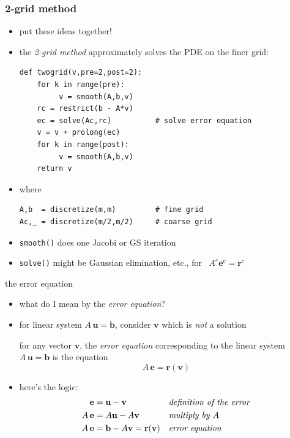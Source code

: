 \documentclass[10pt,
               svgnames,
               hyperref={colorlinks,citecolor=DeepPink4,linkcolor=FireBrick,urlcolor=Maroon},
               usepdftitle=false]{beamer}
\newcommand{\bb}{\mathbf{b}}
\newcommand{\be}{\mathbf{e}}
\newcommand{\br}{\mathbf{r}}
\newcommand{\bu}{\mathbf{u}}
\newcommand{\bv}{\mathbf{v}}
\begin{document}
\begin{frame}[fragile]
\frametitle{2-grid method}
\begin{itemize}
\item put these ideas together!
\item the \emph{2-grid method} approximately solves the PDE on the finer grid:

\bigskip
\begin{verbatim}
def twogrid(v,pre=2,post=2):
    for k in range(pre):
         v = smooth(A,b,v)
    rc = restrict(b - A*v)
    ec = solve(Ac,rc)          # solve error equation
    v = v + prolong(ec)
    for k in range(post):
         v = smooth(A,b,v)
    return v
\end{verbatim}

\medskip
\item where
\begin{verbatim}
A,b  = discretize(m,m)         # fine grid
Ac,_ = discretize(m/2,m/2)     # coarse grid
\end{verbatim}
\item \texttt{smooth()} does one Jacobi or GS iteration
\item \texttt{solve()} might be Gaussian elimination, etc., for \, $A^c \be^c = \br^c$
\end{itemize}
\end{frame}


\begin{frame}{the error equation}
\begin{itemize}
\item what do I mean by the \emph{error equation}?
\item for linear system $A\,\bu=\bb$, consider $\bv$ which is \emph{not} a solution

\begin{definition}
for any vector $\bv$, the \emph{error equation} corresponding to the linear system $A\,\bu = \bb$ is the equation
	$$A\,\be = \br(\bv)$$
\end{definition}

\item here's the logic:
\begin{align*}
    \be &= \bu - \bv                   &&\text{\emph{definition of the error}}\\
    A\, \be &= A \bu - A \bv           &&\text{\emph{multiply by $A$}}\\
    A\, \be &= \bb - A \bv = \br(\bv)  &&\text{\emph{error equation}}
\end{align*}
\end{itemize}
\end{frame}
\end{document}
